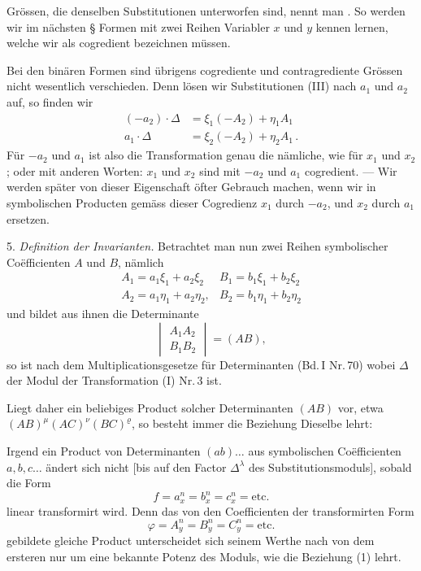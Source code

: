 Grössen, die denselben Substitutionen unterworfen sind, nennt man . So werden wir im nächsten § Formen mit zwei Reihen Variabler $x$ und $y$ kennen lernen, welche wir als cogredient bezeichnen müssen.

Bei den binären Formen sind übrigens cogrediente und contragrediente Grössen nicht wesentlich verschieden. Denn lösen wir Substitutionen (III) nach $a_1$ und $a_2$ auf, so finden wir
\[
\begin{aligned}
(-a_2)\cdot\Delta &= \xi_1(-A_2) + \eta_1A_1 \\
a_1\cdot\Delta &= \xi_2(-A_2) + \eta_2A_1\,.
\end{aligned}
\]
Für $-a_2$ und $a_1$ ist also die Transformation genau die nämliche, wie für $x_1$ und $x_2$; oder mit anderen Worten: $x_1$ und $x_2$ sind mit $-a_2$ und $a_1$ cogredient. — Wir werden später von dieser Eigenschaft öfter Gebrauch machen, wenn wir in symbolischen Producten gemäss dieser Cogredienz $x_1$ durch $-a_2$, und $x_2$ durch $a_1$ ersetzen.


5. \textit{Definition der Invarianten.} Betrachtet man nun zwei Reihen
symbolischer Co\"efficienten $A$ und $B$, nämlich
\[
\begin{array}{ll}
A_1 = a_1\xi_1 + a_2\xi_2 & B_1 = b_1\xi_1+b_2\xi_2\\
A_2 = a_1\eta_1+a_2\eta_2, & B_2 = b_1\eta_1+b_2\eta_2
\end{array}
\]
und bildet aus ihnen die Determinante
\[
\begin{vmatrix} A_1A_2\\ B_1B_2 \end{vmatrix} = (AB),
\]
so ist nach dem Multiplicationsgesetze für Determinanten (Bd.\,I Nr.\,70)
wobei $\Delta$ der Modul der Transformation (I) Nr.\,3 ist.

Liegt daher ein beliebiges Product solcher Determinanten $(AB)$
vor, etwa $(AB)^\mu(AC)^\nu(BC)^\varrho$, so besteht immer die Beziehung
Dieselbe lehrt:

\glqq Irgend ein Product von Determinanten $(ab)\ldots$ aus symbolischen
Co\"efficienten $a, b, c\ldots$ ändert sich nicht [bis auf den
Factor $\Delta^\lambda$ des Substitutionsmoduls], sobald die Form
\[
f = a_x^n = b_x^n = c_x^n = \text{etc.}
\]
linear transformirt wird. Denn das von den Coefficienten der
transformirten Form
\[
\varphi = A_y^n = B_y^n = C_y^n = \text{etc.}
\]
gebildete gleiche Product unterscheidet sich seinem Werthe nach
von dem ersteren nur um eine bekannte Potenz des Moduls, wie die
Beziehung (1) lehrt.\grqq{}

